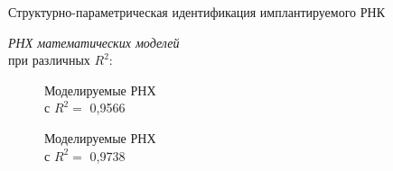 \documentclass[a4paper, 9pt]{beamer}
\begin{document}
\begin{frame}{Структурно-параметрическая идентификация имплантируемого РНК}
\tiny

\begin{minipage}[ht]{0.35\textwidth} 

\emph{РНХ математических моделей} \\ при различных $R^2$:

\vskip-6pt
\begin{figure}
\vskip-6pt
\caption{\tiny Моделируемые РНХ \\ с $R^2 =$ 0,9566}
\end{figure}

\vskip-12pt
\begin{figure}
\vskip-6pt
\caption{\tiny Моделируемые РНХ \\ с $R^2 =$ 0,9738}
\end{figure}


\end{minipage}
\end{frame}
\end{document}
